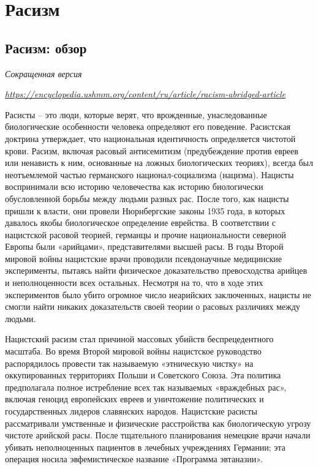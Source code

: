 \chapter{Расизм}

\section{Расизм: обзор}

\textit{Сокращенная версия}

\textit{\url{https://encyclopedia.ushmm.org/content/ru/article/racism-abridged-article}}


Расисты – это люди, которые верят, что врожденные, унаследованные биологические особенности человека определяют его поведение. Расистская доктрина утверждает, что национальная идентичность определяется чистотой крови. Расизм, включая расовый антисемитизм (предубеждение против евреев или ненависть к ним, основанные на ложных биологических теориях), всегда был неотъемлемой частью германского национал-социализма (нацизма). Нацисты воспринимали всю историю человечества как историю биологически обусловленной борьбы между людьми разных рас. После того, как нацисты пришли к власти, они провели Нюрнбергские законы 1935 года, в которых давалось якобы биологическое определение еврейства. В соответствии с нацистской расовой теорией, германцы и прочие национальности северной Европы были «арийцами», представителями высшей расы. В годы Второй мировой войны нацистские врачи проводили псевдонаучные медицинские эксперименты, пытаясь найти физическое доказательство превосходства арийцев и неполноценности всех остальных. Несмотря на то, что в ходе этих экспериментов было убито огромное число неарийских заключенных, нацисты не смогли найти никаких доказательств своей теории о расовых различиях между людьми.

Нацистский расизм стал причиной массовых убийств беспрецедентного масштаба. Во время Второй мировой войны нацистское руководство распорядилось провести так называемую «этническую чистку» на оккупированных территориях Польши и Советского Союза. Эта политика предполагала полное истребление всех так называемых «враждебных рас», включая геноцид европейских евреев и уничтожение политических и государственных лидеров славянских народов. Нацистские расисты рассматривали умственные и физические расстройства как биологическую угрозу чистоте арийской расы. После тщательного планирования немецкие врачи начали убивать неполноценных пациентов в лечебных учреждениях Германии; эта операция носила эвфемистическое название «Программа эвтаназии».

